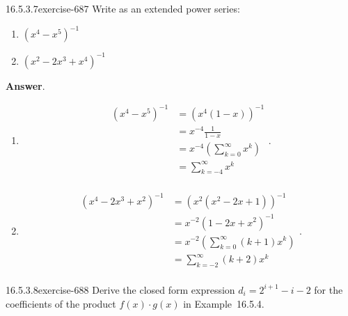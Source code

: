\documentclass[twoside,10pt,]{book}
\numberwithin{equation}{section}
\begin{document}
\begin{divisionsolution}{16.5.3.7}{}{exercise-687}%
\hypertarget{p-6111}{}%
Write as an extended power series:\leavevmode%
\begin{enumerate}[label=(\alph*)]
\item\hypertarget{li-2703}{}\hypertarget{p-6112}{}%
\(\left(x^4-x^5\right)^{-1}\)%
\item\hypertarget{li-2704}{}\hypertarget{p-6113}{}%
\(\left(x^2-2x^3+x^4\right)^{-1}\)%
\end{enumerate}
%
\par\smallskip%
\noindent\textbf{Answer}.\quad%
\hypertarget{p-6114}{}%
\leavevmode%
\begin{enumerate}[label=(\alph*)]
\item\hypertarget{li-2705}{}\hypertarget{p-6115}{}%
%
\begin{equation*}
\begin{split}
\left(x^4-x^5\right)^{-1} & =(x^4 (1-x))^{-1}\\
&=x^{-4}\frac{1}{1-x}\\
& =x^{-4}\left(\sum_{k=0}^{\infty }  x^k\right)\\
&=\sum_{k=-4}^{\infty} x^k\\
\end{split}\text{.}
\end{equation*}
%
\item\hypertarget{li-2706}{}\hypertarget{p-6116}{}%
%
\begin{equation*}
\begin{split}
\left(x^4-2 x^3+x^2\right)^{-1} & =\left(x^2 \left(x^2-2 x+1\right)\right)^{-1}\\
&=x^{-2}\left(1-2x+x^2\right)^{-1}\\
& =x^{-2}\left(\sum_{k=0}^{\infty } (k+1) x^k\right)\\
&=\sum_{k=-2}^{\infty} (k+2) x^k\\
\end{split}\text{.}
\end{equation*}
%
\end{enumerate}
%
\end{divisionsolution}%
\begin{divisionsolution}{16.5.3.8}{}{exercise-688}%
\hypertarget{p-6117}{}%
Derive the closed form expression \(d_i = 2^{i+1}-i -2 \) for the coefficients of the product \(f(x)\cdot g(x)\) in Example~16.5.4.%
\end{divisionsolution}%
%
\end{document}
